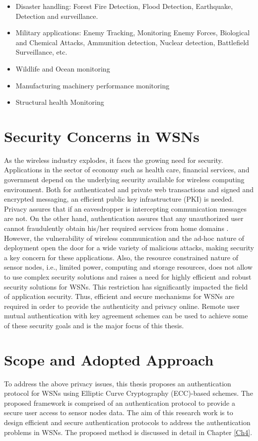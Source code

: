 \documentclass[a4paper,12pt]{report}
\begin{document}
\begin{itemize}
\item Disaster handling: Forest Fire Detection, Flood Detection, Earthquake, Detection and surveillance.
\item Military applications: Enemy Tracking, Monitoring Enemy Forces, Biological and Chemical Attacks,
Ammunition detection, Nuclear detection,  Battlefield Surveillance,
etc.
\item Wildlife and Ocean monitoring
\item Manufacturing machinery performance monitoring
\item Structural health Monitoring
\end{itemize}


\section{Security Concerns in WSNs}
As the wireless industry explodes, it faces the growing need for
security. Applications in the sector of economy such as health care,
financial services, and government depend on the underlying security
available for wireless computing environment. Both for authenticated
and private web transactions and signed and encrypted messaging, an
efficient public key infrastructure (PKI) is needed. Privacy assures
that if an eavesdropper is intercepting communication messages are
not. On the other hand, authentication assures that any unauthorized
user cannot fraudulently obtain his/her required services from home
domains \cite{lee2009}. However, the vulnerability of wireless
communication and the ad-hoc nature of deployment open the door for
a wide variety of malicious attacks, making security a key concern
for these applications. Also, the resource constrained nature of
sensor nodes, i.e., limited power, computing and storage resources,
does not allow to use complex security solutions and raises a need
for highly efficient and robust security solutions for WSNs. This
restriction has significantly impacted the field of application
security. Thus, efficient and secure mechanisms for WSNs are
required in order to provide the authenticity and privacy online.
Remote user mutual authentication with key agreement schemes can be
used to achieve some of these security goals and is the major focus
of this thesis.

\section{Scope and Adopted Approach}
To address the above privacy issues, this thesis proposes an
authentication protocol for WSNs using Elliptic Curve Cryptography
(ECC)-based schemes. The proposed framework is comprised of an
authentication protocol to provide a secure user access to sensor
nodes data. The aim of this research work is to design efficient and
secure authentication protocols to address the authentication
problems in WSNs. The proposed method is discussed in detail in
Chapter \ref{Ch4}.
\end{document}

